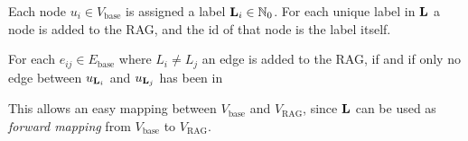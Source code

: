 Each node $u_i \in V_{\text{base}} $ is assigned a 
label $\mathbf{L}_{i} \in  \mathbb{N}_0$.
For each unique label in $\mathbf{L}$ a node is added to the RAG, 
and the id of that node is the label itself.

For each $e_{ij} \in E_{\text{base}}$ where $L_i \neq L_j$ an edge is added to the RAG,
if and if only no edge between $u_{\mathbf{L}_i}$ and $u_{\mathbf{L}_j}$ has been in 



This allows an easy mapping between $V_{\text{base}}$ and $V_{\text{RAG}}$, 
since $\mathbf{L}$  can be used as \emph{forward mapping} from $V_{\text{base}}$ to $V_{\text{RAG}}$.


